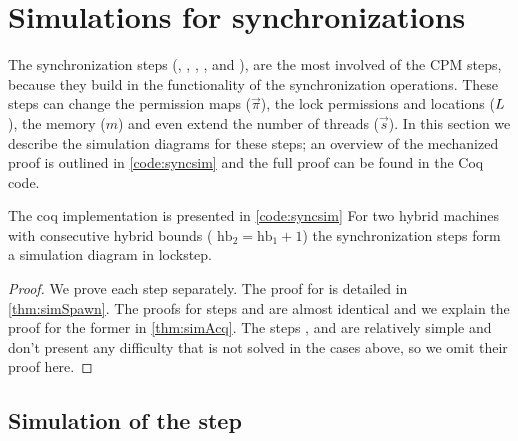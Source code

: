 \section{Simulations for synchronizations}\label{sec:simSync}

The synchronization steps (, , , ,  and ), are the most involved of the CPM steps, because they build in the functionality of the synchronization operations. These steps can change the permission maps ($\vec{\pi}$), the lock permissions and locations ($L$), the memory ($m$) and even extend the number of threads ($\vec{s}$). In this section we describe the simulation diagrams for these steps; an overview of the mechanized proof is outlined in \cref{code:syncsim} and the full proof can be found in the Coq code. 

\begin{fnlemma}{The coq implementation is presented in \cref{code:syncsim}}\label{thm:simSync}
For two hybrid machines with consecutive hybrid bounds ( $\text{hb}_2 = \text{hb}_1 +1$) the synchronization steps form a simulation diagram in lockstep.
%
\end{fnlemma}

\begin{proof}
We prove each step separately. 
The proof for  is detailed in \cref{thm:simSpawn}. 
The proofs for steps  and  are almost identical and we explain the proof for the former in \cref{thm:simAcq}. 
The steps ,  and  are relatively simple and don't present any difficulty that is not solved in the cases above, so we omit their proof here. 
\end{proof}

\subsection{Simulation of the  step}

